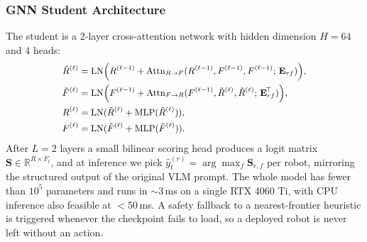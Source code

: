 \subsubsection{GNN Student Architecture}
The student is a 2-layer cross-attention network with hidden dimension $H=64$ and 4 heads:
\begin{equation}
\small
\begin{aligned}
\tilde{R}^{(\ell)} &= \operatorname{LN}\!\Big(R^{(\ell-1)} + \operatorname{Attn}_{R\to F}(R^{(\ell-1)},F^{(\ell-1)},F^{(\ell-1)};\,\mathbf{E}_{rf})\Big),\\
\tilde{F}^{(\ell)} &= \operatorname{LN}\!\Big(F^{(\ell-1)} + \operatorname{Attn}_{F\to R}(F^{(\ell-1)},\tilde{R}^{(\ell)},\tilde{R}^{(\ell)};\,\mathbf{E}_{rf}^{\!\top})\Big),\\
R^{(\ell)} &= \operatorname{LN}(\tilde{R}^{(\ell)}+\operatorname{MLP}(\tilde{R}^{(\ell)})),\\
F^{(\ell)} &= \operatorname{LN}(\tilde{F}^{(\ell)}+\operatorname{MLP}(\tilde{F}^{(\ell)})).
\end{aligned}
\end{equation}
After $L=2$ layers a small bilinear scoring head produces a logit matrix $\mathbf{S}\in\mathbb{R}^{R\times F_t}$, and at inference we pick $\hat{y}_t^{(r)}=\arg\max_f \mathbf{S}_{r,f}$ per robot, mirroring the structured output of the original VLM prompt. The whole model has fewer than $10^5$ parameters and runs in ${\sim}3$\,ms on a single RTX 4060 Ti, with CPU inference also feasible at ${<}50$\,ms. A safety fallback to a nearest-frontier heuristic is triggered whenever the checkpoint fails to load, so a deployed robot is never left without an action.

